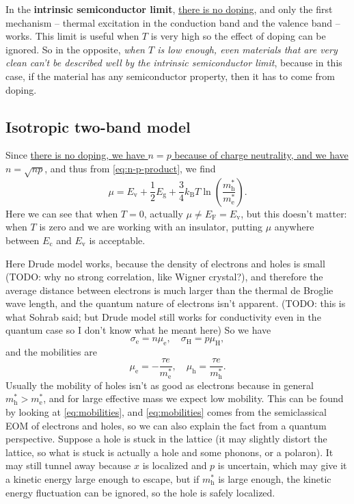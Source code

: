 \documentclass[hyperref, a4paper]{article}
\newcommand*{\concept}[1]{{\textbf{#1}}}
\begin{document}
In the \concept{intrinsic semiconductor limit},
\ul{there is no doping}, and only the first mechanism 
-- thermal excitation in the conduction band and the valence band --
works. 
This limit is useful 
when $T$ is very high so the effect of doping can be ignored.
So in the opposite, 
\emph{when $T$ is low enough, 
even materials that are very clean can't be described well by the intrinsic semiconductor limit},
because in this case, if the material has any semiconductor property,
then it has to come from doping.

\subsection{Isotropic two-band model}

Since \ul{there is no doping, we have $n = p$ because of charge neutrality,
and we have $n = \sqrt{np}$},
and thus from \eqref{eq:n-p-product}, we find 
\begin{equation}
    \mu = E_{\text{v}} + \frac{1}{2} E_{\text{g}} + \frac{3}{4} k_{\text{B}} T \ln(\frac{m_\text{h}^*}{m_{\text{e}}^*}).
    \label{eq:mu-nat}
\end{equation}
Here we can see that when $T = 0$, 
actually $\mu \neq E_{\text{F}} = E_{\text{v}}$,
but this doesn't matter:
when $T$ is zero and we are working with an insulator,
putting $\mu$ anywhere between $E_{\text{c}}$ and $E_{\text{v}}$ is acceptable.

Here Drude model works, because the density of electrons and holes is small 
(TODO: why no strong correlation, like Wigner crystal?),
and therefore the average distance between electrons 
is much larger than the thermal de Broglie wave length,
and the quantum nature of electrons isn't apparent.
(TODO: this is what Sohrab said; but Drude model still works 
for conductivity even in the quantum case so I don't know what he meant here)
So we have 
\begin{equation}
    \sigma_\text{e} = n \mu_{\text{e}}, \quad 
    \sigma_{\text{H}} = p \mu_{\text{H}},
\end{equation}
and the mobilities are 
\begin{equation}
    \mu_{\text{e}} = - \frac{\tau e}{m^*_{\text{e}}}, \quad 
    \mu_{\text{h}} =   \frac{\tau e}{m^*_{\text{h}}}.
    \label{eq:mobilities}
\end{equation}
Usually the mobility of holes isn't as good as electrons because in general 
$m_{\text{h}}^* > m_{\text{e}}^*$,
and for large effective mass we expect low mobility.
This can be found by looking at \eqref{eq:mobilities},
and \eqref{eq:mobilities} comes from the semiclassical EOM of electrons and holes,
so we can also explain the fact from a quantum perspective.
Suppose a hole is stuck in the lattice 
(it may slightly distort the lattice,
so what is stuck is actually a hole and some phonons, 
or a polaron).
It may still tunnel away because $x$ is localized 
and $p$ is uncertain, which may give it a kinetic energy large enough to escape,
but if $m^*_{\text{h}}$ is large enough, 
the kinetic energy fluctuation can be ignored,
so the hole is safely localized.
\end{document}
